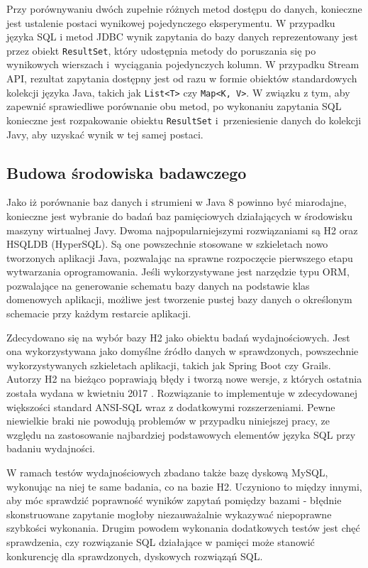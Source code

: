 \documentclass[12pt,twoside,openright]{extarticle}
\begin{document}
    Przy porównywaniu dwóch zupełnie różnych metod dostępu do danych, konieczne jest ustalenie postaci wynikowej pojedynczego eksperymentu. W przypadku języka SQL i metod JDBC wynik zapytania do bazy danych reprezentowany jest przez obiekt \texttt{ResultSet}, który udostępnia metody do poruszania się po wynikowych wierszach i~wyciągania pojedynczych kolumn. W przypadku Stream API, rezultat zapytania dostępny jest od razu w formie obiektów standardowych kolekcji języka Java, takich jak \texttt{List<T>} czy \texttt{Map<K, V>}. W związku z tym, aby zapewnić sprawiedliwe porównanie obu metod, po wykonaniu zapytania SQL konieczne jest rozpakowanie obiektu \texttt{ResultSet} i~przeniesienie danych do kolekcji Javy, aby uzyskać wynik w tej samej postaci.


\subsection{Budowa środowiska badawczego}

    Jako iż porównanie baz danych i strumieni w Java 8 powinno być miarodajne, konieczne jest wybranie do badań baz pamięciowych działających w środowisku maszyny wirtualnej Javy. Dwoma najpopularniejszymi rozwiązaniami są H2 oraz HSQLDB (HyperSQL). Są one powszechnie stosowane w szkieletach nowo tworzonych aplikacji Java, pozwalając na sprawne rozpoczęcie pierwszego etapu wytwarzania oprogramowania. Jeśli wykorzystywane jest narzędzie typu ORM, pozwalające na generowanie schematu bazy danych na podstawie klas domenowych aplikacji, możliwe jest tworzenie pustej bazy danych o określonym schemacie przy każdym restarcie aplikacji. 
    
    Zdecydowano się na wybór bazy H2 jako obiektu badań wydajnościowych. Jest ona wykorzystywana jako domyślne źródło danych w sprawdzonych, powszechnie wykorzystywanych szkieletach aplikacji, takich jak Spring Boot czy Grails. Autorzy H2 na bieżąco poprawiają błędy i tworzą nowe wersje, z których ostatnia została wydana w kwietniu 2017 \cite{h2maven}. Rozwiązanie to implementuje w zdecydowanej większości standard ANSI-SQL wraz z dodatkowymi rozszerzeniami. Pewne niewielkie braki nie powodują problemów w przypadku niniejszej pracy, ze względu na zastosowanie najbardziej podstawowych elementów języka SQL przy badaniu wydajności.

    W ramach testów wydajnościowych zbadano także bazę dyskową MySQL, wykonując na niej te same badania, co na bazie H2. Uczyniono to między innymi, aby móc sprawdzić poprawność wyników zapytań pomiędzy bazami - błędnie skonstruowane zapytanie mogłoby niezauważalnie wykazywać niepoprawne szybkości wykonania. Drugim powodem wykonania dodatkowych testów jest chęć sprawdzenia, czy rozwiązanie SQL działające w pamięci może stanowić konkurencję dla sprawdzonych, dyskowych rozwiąząń SQL.
\end{document}
